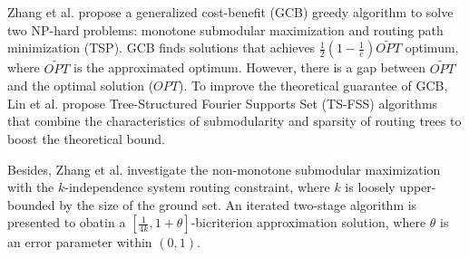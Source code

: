 Zhang et al. \cite{zhang2016submodular} propose a generalized cost-benefit (GCB) greedy algorithm
to solve two NP-hard problems: monotone submodular maximization and routing path minimization (TSP).
GCB finds solutions that achieves $\frac{1}{2}(1-\frac{1}{e})\widetilde{OPT}$ optimum, where $\widetilde{OPT}$ is the approximated optimum.
However, there is a gap between $\widetilde{OPT}$ and the optimal solution ($OPT$). To improve the theoretical guarantee of GCB, Lin et al. \cite{Lin2023ST} propose Tree-Structured Fourier Supports Set (TS-FSS) algorithms that combine the characteristics of submodularity and sparsity of routing trees to boost the theoretical bound.

Besides, Zhang et al. \cite{zhang2022nonmonontone} investigate the non-monotone submodular maximization with the $k$-independence system routing constraint, where $k$ is loosely upper-bounded by the size of the ground set.
An iterated two-stage algorithm is presented to obatin a $[\frac{1}{4k}, 1+\theta]$-bicriterion approximation solution, where $\theta$ is an error parameter within $(0,1)$.



